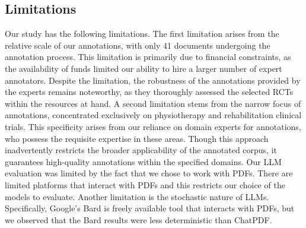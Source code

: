 \documentclass[sn-mathphys,Numbered]{sn-jnl}%
\theoremstyle{thmstyleone}%
\theoremstyle{thmstyletwo}%
\theoremstyle{thmstylethree}%
\begin{document}
\subsection{Limitations}
\label{subsec:limits}
%
Our study has the following limitations.
The first limitation arises from the relative scale of our annotations, with only 41 documents undergoing the annotation process.
This limitation is primarily due to financial constraints, as the availability of funds limited our ability to hire a larger number of expert annotators.
Despite the limitation, the robustness of the annotations provided by the experts remains noteworthy, as they thoroughly assessed the selected RCTs within the resources at hand.
A second limitation stems from the narrow focus of annotations, concentrated exclusively on physiotherapy and rehabilitation clinical trials.
This specificity arises from our reliance on domain experts for annotations, who possess the requisite expertise in these areas.
Though this approach inadvertently restricts the broader applicability of the annotated corpus, it guarantees high-quality annotations within the specified domains.
Our LLM evaluation was limited by the fact that we chose to work with PDFs. 
There are limited platforms that interact with PDFs and this restricts our choice of the models to evaluate.
Another limitation is the stochastic nature of LLMs.
Specifically, Google's Bard is freely available tool that interacts with PDFs, but we observed that the Bard results were less deterministic than ChatPDF.
%
%
%
\end{document}
